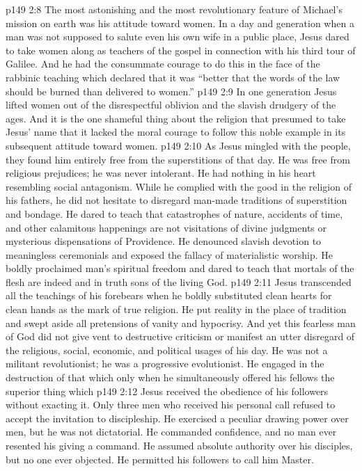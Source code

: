 \pc \vs p149 2:8 The most astonishing and the most revolutionary feature of Michael’s mission on earth was his attitude toward women. In a day and generation when a man was not supposed to salute even his own wife in a public place, Jesus dared to take women along as teachers of the gospel in connection with his third tour of Galilee. And he had the consummate courage to do this in the face of the rabbinic teaching which declared that it was “better that the words of the law should be burned than delivered to women.”
\vs p149 2:9 In one generation Jesus lifted women out of the disrespectful oblivion and the slavish drudgery of the ages. And it is the one shameful thing about the religion that presumed to take Jesus’ name that it lacked the moral courage to follow this noble example in its subsequent attitude toward women.
\pc \vs p149 2:10 As Jesus mingled with the people, they found him entirely free from the superstitions of that day. He was free from religious prejudices; he was never intolerant. He had nothing in his heart resembling social antagonism. While he complied with the good in the religion of his fathers, he did not hesitate to disregard man\hyp{}made traditions of superstition and bondage. He dared to teach that catastrophes of nature, accidents of time, and other calamitous happenings are not visitations of divine judgments or mysterious dispensations of Providence. He denounced slavish devotion to meaningless ceremonials and exposed the fallacy of materialistic worship. He boldly proclaimed man’s spiritual freedom and dared to teach that mortals of the flesh are indeed and in truth sons of the living God.
\vs p149 2:11 Jesus transcended all the teachings of his forebears when he boldly substituted clean hearts for clean hands as the mark of true religion. He put reality in the place of tradition and swept aside all pretensions of vanity and hypocrisy. And yet this fearless man of God did not give vent to destructive criticism or manifest an utter disregard of the religious, social, economic, and political usages of his day. He was not a militant revolutionist; he was a progressive evolutionist. He engaged in the destruction of that which  only when he simultaneously offered his fellows the superior thing which 
\pc \vs p149 2:12 Jesus received the obedience of his followers without exacting it. Only three men who received his personal call refused to accept the invitation to discipleship. He exercised a peculiar drawing power over men, but he was not dictatorial. He commanded confidence, and no man ever resented his giving a command. He assumed absolute authority over his disciples, but no one ever objected. He permitted his followers to call him Master.
